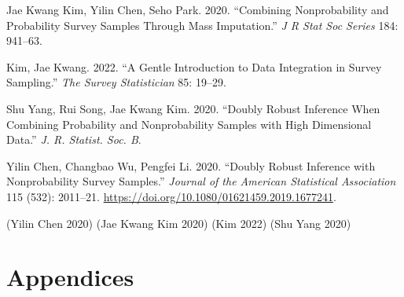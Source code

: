 \documentclass[
  letterpaper,
  DIV=11,
  numbers=noendperiod]{scrreprt}
\newlength{\cslhangindent}
\newlength{\cslentryspacingunit} %
\newenvironment{CSLReferences}[2] %
 {%
  \setlength{\parindent}{0pt}
  \ifodd #1
  \let\oldpar\par
  \def\par{\hangindent=\cslhangindent\oldpar}
  \fi
  \setlength{\parskip}{#2\cslentryspacingunit}
 }%
 {}
\begin{document}
\hypertarget{refs}{}
\begin{CSLReferences}{1}{0}
\leavevmode{}%
Jae Kwang Kim, Yilin Chen, Seho Park. 2020. {``Combining Nonprobability
and Probability Survey Samples Through Mass Imputation.''} \emph{J R
Stat Soc Series} 184: 941--63.

\leavevmode{}%
Kim, Jae Kwang. 2022. {``A Gentle Introduction to Data Integration in
Survey Sampling.''} \emph{The Survey Statistician} 85: 19--29.

\leavevmode{}%
Shu Yang, Rui Song, Jae Kwang Kim. 2020. {``Doubly Robust Inference When
Combining Probability and Nonprobability Samples with High Dimensional
Data.''} \emph{J. R. Statist. Soc. B}.

\leavevmode{}%
Yilin Chen, Changbao Wu, Pengfei Li. 2020. {``Doubly Robust Inference
with Nonprobability Survey Samples.''} \emph{Journal of the American
Statistical Association} 115 (532): 2011--21.
\url{https://doi.org/10.1080/01621459.2019.1677241}.

\end{CSLReferences}

(Yilin Chen 2020) (Jae Kwang Kim 2020) (Kim 2022) (Shu Yang 2020)

\appendix
{}

\hypertarget{appendices-1}{%
\chapter{Appendices}\label{appendices-1}}

\[
\newcommand{\bSigma}{\boldsymbol{\Sigma}}
\newcommand{\bOmega}{\boldsymbol{\Omega}}
\newcommand{\bTheta}{\boldsymbol{\Theta}}
\newcommand{\bPi}{\boldsymbol{\Pi}}
\newcommand{\bbeta}{\boldsymbol{\beta}}
\newcommand{\balpha}{\boldsymbol{\alpha}}
\newcommand{\brho}{\boldsymbol{\rho}}
\newcommand{\beps}{\boldsymbol{\epsilon}}
\newcommand{\blambda}{\boldsymbol{\lambda}}
\newcommand{\bgamma}{\boldsymbol{\gamma}}
\newcommand{\btheta}{\boldsymbol{\theta}}
\newcommand{\bmu}{\boldsymbol{\mu}}
\newcommand{\bpi}{\boldsymbol{\pi}}
\newcommand{\bphi}{\boldsymbol{\phi}}
\newcommand{\bPhi}{\boldsymbol{\Phi}}
\newcommand{\boldeta}{\boldsymbol{\eta}}
\newcommand{\bx}{\boldsymbol{x}}
\newcommand{\bD}{\boldsymbol{D}}
\newcommand{\bV}{\boldsymbol{V}}
\newcommand{\bv}{\boldsymbol{v}}
\newcommand{\bY}{\boldsymbol{Y}}
\newcommand{\bA}{\boldsymbol{A}}
\newcommand{\bB}{\boldsymbol{B}}
\newcommand{\bR}{\boldsymbol{R}}
\newcommand{\bM}{\boldsymbol{M}}
\newcommand{\bI}{\boldsymbol{I}}
\newcommand{\bC}{\boldsymbol{C}}
\newcommand{\bW}{\boldsymbol{W}}
\newcommand{\bw}{\boldsymbol{w}}
\newcommand{\bd}{\boldsymbol{d}}
\newcommand{\bT}{\boldsymbol{T}}
\newcommand{\bt}{\boldsymbol{t}}
\newcommand{\bZ}{\boldsymbol{Z}}
\newcommand{\bX}{\boldsymbol{X}}
\newcommand{\bz}{\boldsymbol{z}}
\newcommand{\by}{\boldsymbol{y}}
\newcommand{\br}{\boldsymbol{r}}
\newcommand{\bp}{\boldsymbol{p}}
\newcommand{\bb}{\boldsymbol{b}}
\newcommand{\bZero}{\boldsymbol{0}}
\newcommand{\bOne}{\boldsymbol{1}}
\]
\end{document}
